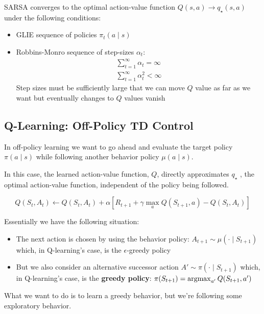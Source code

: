 \begin{theorem}
    SARSA converges to the optimal action-value function $Q(s,a) \to q_\star(s,a)$ under the following conditions:
    \begin{itemize}
        \item GLIE sequence of policies $\pi_t(a \mid s)$
        \item Robbins-Monro sequence of step-sizes $\alpha_t$:
        \begin{align*}
            \sum_{t=1}^{\infty} \alpha_t = \infty \\
            \sum_{t=1}^{\infty} \alpha_t^2 < \infty
        \end{align*}
        Step sizes must be sufficiently large that we can move $Q$ value as far as we want but eventually changes to $Q$ values vanish
    \end{itemize}
\end{theorem}

\subsection{Q-Learning: Off-Policy TD Control}
In off-policy learning we want to go ahead and evaluate the target policy $\pi(a \mid s)$ while following another behavior policy $\mu(a \mid s)$.

In this case, the learned action-value function, $Q$, directly approximates $q_\star$ , the optimal
action-value function, independent of the policy being followed.

\[
    Q(S_t, A_t) \gets Q(S_t, A_t) + \alpha \left[ R_{t+1} + \gamma \max_a Q(S_{t+1}, a) - Q(S_t, A_t) \right]
\]

Essentially we have the following situation:
\begin{itemize}
    \item The next action is chosen by using the behavior policy: $A_{t+1} \sim \mu(\cdot \mid S_{t+1})$ which, in Q-learning's case, is the $\epsilon$-greedy policy
    \item But we also consider an alternative successor action $A' \sim \pi(\cdot \mid S_{t+1})$ which, in Q-learning's case, is the \textbf{greedy policy}: $\pi(S_{t+1}) = \operatorname*{argmax}_{a'} Q(S_{t+1}, a')$
\end{itemize}

What we want to do is to learn a greedy behavior, but we're following some exploratory behavior.

